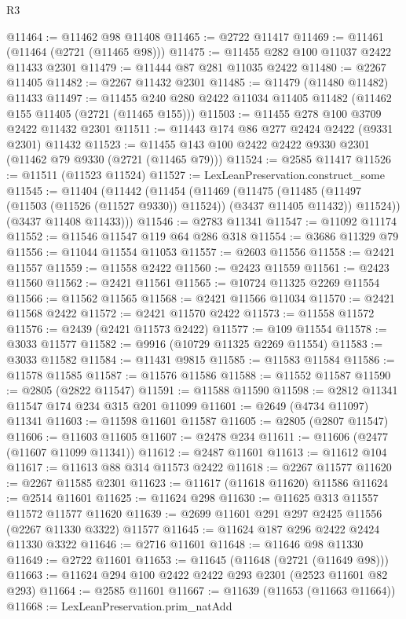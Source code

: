 \begin{lexlean}{R3}
\begin{coremodule}
@11464 := @11462 @98 @11408
@11465 := @2722 @11417
@11469 := @11461 (@11464 (@2721 (@11465 @98)))
@11475 := @11455 @282 @100 @11037 @2422 @11433 @2301
@11479 := @11444 @87 @281 @11035 @2422
@11480 := @2267 @11405
@11482 := @2267 @11432 @2301
@11485 := @11479 (@11480 @11482) @11433
@11497 := @11455 @240 @280 @2422 @11034 @11405 @11482 (@11462 @155 @11405 (@2721 (@11465 @155)))
@11503 := @11455 @278 @100 @3709 @2422 @11432 @2301
@11511 := @11443 @174 @86 @277 @2424 @2422 (@9331 @2301) @11432
@11523 := @11455 @143 @100 @2422 @2422 @9330 @2301 (@11462 @79 @9330 (@2721 (@11465 @79)))
@11524 := @2585 @11417
@11526 := @11511 (@11523 @11524)
@11527 := LexLeanPreservation.construct_some
@11545 := @11404
    (@11442
      (@11454
        (@11469
          (@11475
            (@11485 (@11497 (@11503 (@11526 (@11527 @9330)) @11524)) (@3437 @11405 @11432))
            @11524))
        (@3437 @11408 @11433)))
@11546 := @2783 @11341
@11547 := @11092 @11174
@11552 := @11546 @11547 @119 @64 @286 @318
@11554 := @3686 @11329 @79
@11556 := @11044 @11554 @11053
@11557 := @2603 @11556
@11558 := @2421 @11557
@11559 := @11558 @2422
@11560 := @2423 @11559
@11561 := @2423 @11560
@11562 := @2421 @11561
@11565 := @10724 @11325 @2269 @11554
@11566 := @11562 @11565
@11568 := @2421 @11566 @11034
@11570 := @2421 @11568 @2422
@11572 := @2421 @11570 @2422
@11573 := @11558 @11572
@11576 := @2439 (@2421 @11573 @2422)
@11577 := @109 @11554
@11578 := @3033 @11577
@11582 := @9916 (@10729 @11325 @2269 @11554)
@11583 := @3033 @11582
@11584 := @11431 @9815
@11585 := @11583 @11584
@11586 := @11578 @11585
@11587 := @11576 @11586
@11588 := @11552 @11587
@11590 := @2805 (@2822 @11547)
@11591 := @11588 @11590
@11598 := @2812 @11341 @11547 @174 @234 @315 @201 @11099
@11601 := @2649 (@4734 @11097) @11341
@11603 := @11598 @11601 @11587
@11605 := @2805 (@2807 @11547)
@11606 := @11603 @11605
@11607 := @2478 @234
@11611 := @11606 (@2477 (@11607 @11099 @11341))
@11612 := @2487 @11601
@11613 := @11612 @104
@11617 := @11613 @88 @314 @11573 @2422
@11618 := @2267 @11577
@11620 := @2267 @11585 @2301
@11623 := @11617 (@11618 @11620) @11586
@11624 := @2514 @11601
@11625 := @11624 @298
@11630 := @11625 @313 @11557 @11572 @11577 @11620
@11639 := @2699 @11601 @291 @297 @2425 @11556 (@2267 @11330 @3322) @11577
@11645 := @11624 @187 @296 @2422 @2424 @11330 @3322
@11646 := @2716 @11601
@11648 := @11646 @98 @11330
@11649 := @2722 @11601
@11653 := @11645 (@11648 (@2721 (@11649 @98)))
@11663 := @11624 @294 @100 @2422 @2422 @293 @2301 (@2523 @11601 @82 @293)
@11664 := @2585 @11601
@11667 := @11639 (@11653 (@11663 @11664))
@11668 := LexLeanPreservation.prim_natAdd

\end{coremodule}
\end{lexlean}
